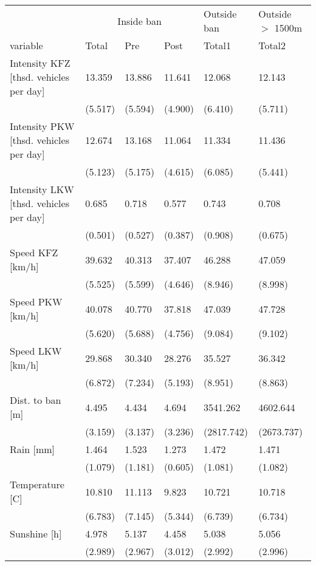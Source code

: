 \begin{table}[!htb]
\centering
\begingroup\footnotesize
\begin{tabular}{llllll}
  \toprule
& \multicolumn{3}{c}{Inside ban} & Outside ban & Outside $>$ 1500m \\ \cmidrule(r){2-4} \cmidrule(r){5-5} \cmidrule(r){6-6}
variable & Total & Pre & Post & Total1 & Total2 \\ 
  \midrule
Intensity KFZ [thsd. vehicles per day] & 13.359 & 13.886 & 11.641 & 12.068 & 12.143 \\ 
   & (5.517) & (5.594) & (4.900) & (6.410) & (5.711) \\ 
  Intensity PKW [thsd. vehicles per day] & 12.674 & 13.168 & 11.064 & 11.334 & 11.436 \\ 
   & (5.123) & (5.175) & (4.615) & (6.085) & (5.441) \\ 
  Intensity LKW  [thsd. vehicles per day] & 0.685 & 0.718 & 0.577 & 0.743 & 0.708 \\ 
   & (0.501) & (0.527) & (0.387) & (0.908) & (0.675) \\ 
  Speed KFZ [km/h] & 39.632 & 40.313 & 37.407 & 46.288 & 47.059 \\ 
   & (5.525) & (5.599) & (4.646) & (8.946) & (8.998) \\ 
  Speed PKW  [km/h] & 40.078 & 40.770 & 37.818 & 47.039 & 47.728 \\ 
   & (5.620) & (5.688) & (4.756) & (9.084) & (9.102) \\ 
  Speed LKW  [km/h] & 29.868 & 30.340 & 28.276 & 35.527 & 36.342 \\ 
   & (6.872) & (7.234) & (5.193) & (8.951) & (8.863) \\ 
  Dist. to ban [m] & 4.495 & 4.434 & 4.694 & 3541.262 & 4602.644 \\ 
   & (3.159) & (3.137) & (3.236) & (2817.742) & (2673.737) \\ 
  Rain [mm] & 1.464 & 1.523 & 1.273 & 1.472 & 1.471 \\ 
   & (1.079) & (1.181) & (0.605) & (1.081) & (1.082) \\ 
  Temperature [C] & 10.810 & 11.113 & 9.823 & 10.721 & 10.718 \\ 
   & (6.783) & (7.145) & (5.344) & (6.739) & (6.734) \\ 
  Sunshine [h] & 4.978 & 5.137 & 4.458 & 5.038 & 5.056 \\ 
   & (2.989) & (2.967) & (3.012) & (2.992) & (2.996) \\ 

\end{tabular}
\end{table}
